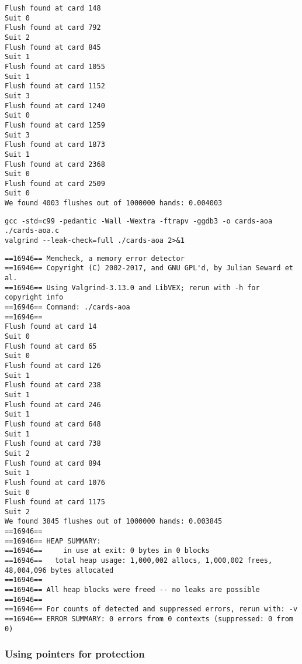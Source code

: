 \documentclass[11pt]{article}
\begin{document}
\begin{verbatim}
Flush found at card 148
Suit 0
Flush found at card 792
Suit 2
Flush found at card 845
Suit 1
Flush found at card 1055
Suit 1
Flush found at card 1152
Suit 3
Flush found at card 1240
Suit 0
Flush found at card 1259
Suit 3
Flush found at card 1873
Suit 1
Flush found at card 2368
Suit 0
Flush found at card 2509
Suit 0
We found 4003 flushes out of 1000000 hands: 0.004003
\end{verbatim}

\begin{verbatim}
gcc -std=c99 -pedantic -Wall -Wextra -ftrapv -ggdb3 -o cards-aoa ./cards-aoa.c
valgrind --leak-check=full ./cards-aoa 2>&1
\end{verbatim}

\begin{verbatim}
==16946== Memcheck, a memory error detector
==16946== Copyright (C) 2002-2017, and GNU GPL'd, by Julian Seward et al.
==16946== Using Valgrind-3.13.0 and LibVEX; rerun with -h for copyright info
==16946== Command: ./cards-aoa
==16946== 
Flush found at card 14
Suit 0
Flush found at card 65
Suit 0
Flush found at card 126
Suit 1
Flush found at card 238
Suit 1
Flush found at card 246
Suit 1
Flush found at card 648
Suit 1
Flush found at card 738
Suit 2
Flush found at card 894
Suit 1
Flush found at card 1076
Suit 0
Flush found at card 1175
Suit 2
We found 3845 flushes out of 1000000 hands: 0.003845
==16946== 
==16946== HEAP SUMMARY:
==16946==     in use at exit: 0 bytes in 0 blocks
==16946==   total heap usage: 1,000,002 allocs, 1,000,002 frees, 48,004,096 bytes allocated
==16946== 
==16946== All heap blocks were freed -- no leaks are possible
==16946== 
==16946== For counts of detected and suppressed errors, rerun with: -v
==16946== ERROR SUMMARY: 0 errors from 0 contexts (suppressed: 0 from 0)
\end{verbatim}


\subsubsection{Using pointers for protection}
\label{sec:org326064a}
\end{document}
